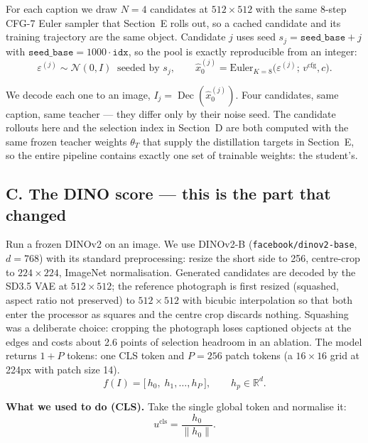 \documentclass[11pt,a4paper]{article}
\DeclareMathOperator{\Dec}{Dec}
\begin{document}
For each caption we draw $N = 4$ candidates at $512\times512$ with the same 8-step CFG-7 Euler sampler that Section~E rolls out, so a cached candidate and its training trajectory are the same object. Candidate $j$ uses seed $s_j = \texttt{seed\_base} + j$ with $\texttt{seed\_base} = 1000\cdot\texttt{idx}$, so the pool is exactly reproducible from an integer:
\begin{equation}
\varepsilon^{(j)} \sim \mathcal{N}(0,I) \ \text{ seeded by } s_j, \qquad \hat{x}_0^{(j)} = \text{Euler}_{K=8}\big(\varepsilon^{(j)};\, v^{\text{cfg}}, c\big).
\end{equation}

We decode each one to an image, $I_j = \Dec(\hat{x}_0^{(j)})$. Four candidates, same caption, same teacher --- they differ only by their noise seed. The candidate rollouts here and the selection index in Section~D are both computed with the same frozen teacher weights $\theta_T$ that supply the distillation targets in Section~E, so the entire pipeline contains exactly one set of trainable weights: the student's.

\subsection*{C. The DINO score --- this is the part that changed}

Run a frozen DINOv2 on an image. We use DINOv2-B (\texttt{facebook/dinov2-base}, $d = 768$) with its standard preprocessing: resize the short side to 256, centre-crop to $224\times224$, ImageNet normalisation. Generated candidates are decoded by the SD3.5 VAE at $512\times512$; the reference photograph is first resized (squashed, aspect ratio not preserved) to $512\times512$ with bicubic interpolation so that both enter the processor as squares and the centre crop discards nothing. Squashing was a deliberate choice: cropping the photograph loses captioned objects at the edges and costs about 2.6 points of selection headroom in an ablation. The model returns $1 + P$ tokens: one CLS token and $P = 256$ patch tokens (a $16\times16$ grid at 224px with patch size 14).
\begin{equation}
f(I) = \big[\,h_0,\; h_1, \ldots, h_P\,\big], \qquad h_p \in \mathbb{R}^d.
\end{equation}

\noindent\textbf{What we used to do (CLS).} Take the single global token and normalise it:
\begin{equation}
u^{\text{cls}} = \frac{h_0}{\lVert h_0 \rVert}.
\end{equation}
\end{document}
